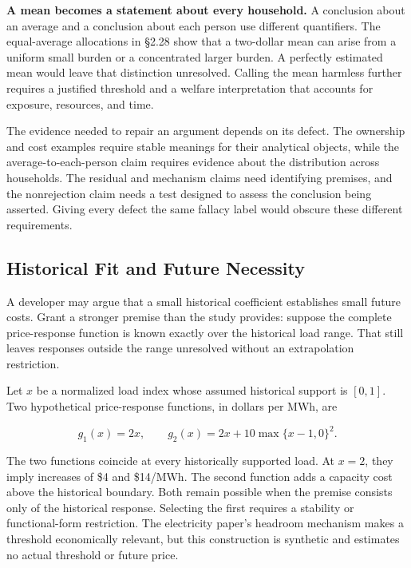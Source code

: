 \textbf{A mean becomes a statement about every household.} A conclusion
about an average and a conclusion about each person use different
quantifiers. The equal-average allocations in §2.28 show that a
two-dollar mean can arise from a uniform small burden or a concentrated
larger burden. A perfectly estimated mean would leave that distinction
unresolved. Calling the mean harmless further requires a justified
threshold and a welfare interpretation that accounts for exposure,
resources, and time.

The evidence needed to repair an argument depends on its defect. The
ownership and cost examples require stable meanings for their analytical
objects, while the average-to-each-person claim requires evidence about
the distribution across households. The residual and mechanism claims
need identifying premises, and the nonrejection claim needs a test
designed to assess the conclusion being asserted. Giving every defect
the same fallacy label would obscure these different requirements.

\hypertarget{M09-historical-fit-and-future-necessity}{%
\subsection{Historical Fit and Future
Necessity}\label{M09-historical-fit-and-future-necessity}}

\noindent \noindent A developer may argue that a small historical coefficient
establishes small future costs. Grant a stronger premise than the study
provides: suppose the complete price-response function is known exactly
over the historical load range. That still leaves responses outside the
range unresolved without an extrapolation restriction.

Let \(x\) be a normalized load index whose assumed historical support is
\([0,1]\). Two hypothetical price-response functions, in dollars per
MWh, are

\[
g_1(x)=2x,\qquad g_2(x)=2x+10\max\{x-1,0\}^2.
\]

The two functions coincide at every historically supported load. At
\(x=2\), they imply increases of \$4 and \$14/MWh. The second function
adds a capacity cost above the historical boundary. Both remain possible
when the premise consists only of the historical response. Selecting the
first requires a stability or functional-form restriction. The
electricity paper's headroom mechanism makes a threshold economically
relevant, but this construction is synthetic and estimates no actual
threshold or future price.

